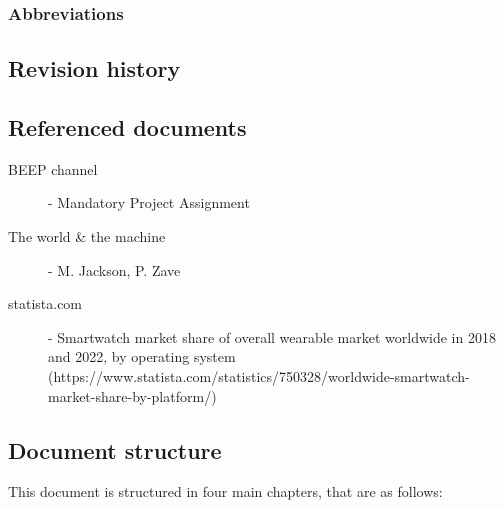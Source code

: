 \documentclass[../main.tex]{subfiles}
\begin{document}
\subsubsection{Abbreviations}

\subsection{Revision history}
\subsection{Referenced documents}

\begin{minipage}{\textwidth}
\begin{description}
	\item [BEEP channel] - Mandatory Project Assignment
	\item [The world \& the machine] - M. Jackson, P. Zave
	\item [statista.com] - Smartwatch market share of overall wearable market worldwide in 2018 and 2022, by operating system (https://www.statista.com/statistics/750328/worldwide-smartwatch-market-share-by-platform/)
\end{description}
\end{minipage}

\subsection{Document structure}

This document is structured in four main chapters, that are as follows:
\end{document}
